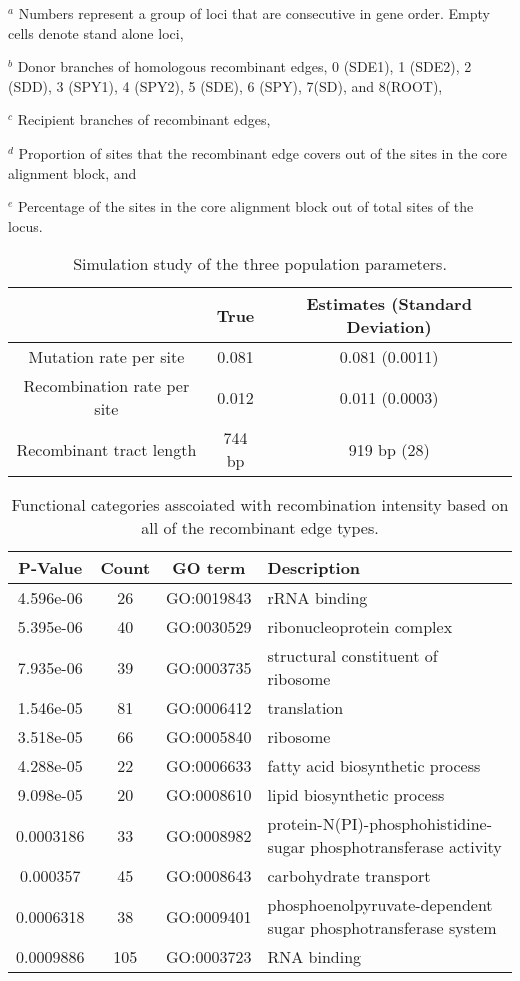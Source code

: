 \documentclass[english]{article}
\providecommand{\tabularnewline}{\\}
\begin{document}
\begin{table}
{$^a$ Numbers represent a group of loci that are consecutive in gene order. Empty
cells denote stand alone loci,

$^b$ Donor branches of homologous recombinant edges, 0 (SDE1), 1 (SDE2), 2
(SDD), 3 (SPY1), 4 (SPY2), 5 (SDE), 6 (SPY), 7(SD), and 8(ROOT),

$^c$ Recipient branches of recombinant edges,

$^d$ Proportion of sites that the recombinant edge covers out of the sites in
the core alignment block, and

$^e$ Percentage of the sites in the core alignment block out of total sites of
the locus.
}

\end{table}
\clearpage{}



\begin{table}
\caption{\label{tab:sim-three-population-parameters}
Simulation study of the three population parameters.}
\noindent \begin{centering}
\begin{tabular}{ccc}
 & True & Estimates (Standard Deviation)\tabularnewline
\hline
Mutation rate per site & 0.081 & 0.081 (0.0011)\tabularnewline
Recombination rate per site & 0.012 & 0.011 (0.0003)\tabularnewline
Recombinant tract length & 744 bp & 919 bp (28)\tabularnewline
\hline
\end{tabular}
\par\end{centering}
\end{table}
\clearpage{}

\begin{table}
\caption{\label{tab:functional-all}Functional categories asscoiated with 
recombination intensity based on all of the recombinant edge types.}
\begin{tabular}{cccl}
\hline 
P-Value & Count & GO term & Description\tabularnewline
\hline 
4.596e-06 & 26 & GO:0019843 & rRNA binding\tabularnewline
5.395e-06 & 40 & GO:0030529 & ribonucleoprotein complex\tabularnewline
7.935e-06 & 39 & GO:0003735 & structural constituent of ribosome\tabularnewline
1.546e-05 & 81 & GO:0006412 & translation\tabularnewline
3.518e-05 & 66 & GO:0005840 & ribosome\tabularnewline
4.288e-05 & 22 & GO:0006633 & fatty acid biosynthetic process\tabularnewline
9.098e-05 & 20 & GO:0008610 & lipid biosynthetic process\tabularnewline
0.0003186 & 33 & GO:0008982 & protein-N(PI)-phosphohistidine-sugar phosphotransferase activity\tabularnewline
0.000357 & 45 & GO:0008643 & carbohydrate transport\tabularnewline
0.0006318 & 38 & GO:0009401 & phosphoenolpyruvate-dependent sugar phosphotransferase system\tabularnewline
0.0009886 & 105 & GO:0003723 & RNA binding\tabularnewline
\hline 
\end{tabular}
\end{table}
\clearpage{}
\end{document}
